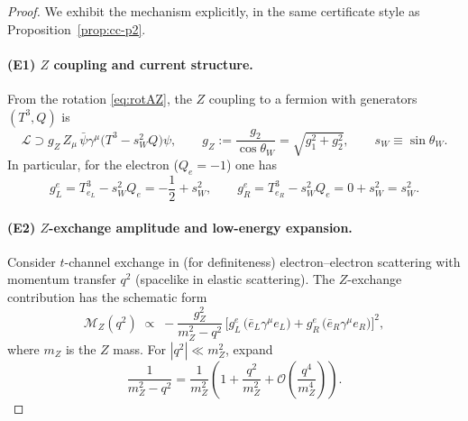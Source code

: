 \documentclass[11pt]{article}
\theoremstyle{remark}
\newcommand{\cO}{\mathcal{O}}
\begin{document}
\begin{proof}
We exhibit the mechanism explicitly, in the same certificate style as Proposition~\ref{prop:cc-p2}.

\paragraph{(E1) $Z$ coupling and current structure.}
From the rotation \eqref{eq:rotAZ}, the $Z$ coupling to a fermion with generators $(T^3,Q)$ is
\begin{equation}\label{eq:Z-coupling}
\mathcal{L}\supset g_Z\,Z_\mu\,\bar\psi\gamma^\mu\big(T^3-s_W^2 Q\big)\psi,
\qquad g_Z:=\frac{g_2}{\cos\theta_W}=\sqrt{g_1^2+g_2^2},\qquad s_W\equiv\sin\theta_W.
\end{equation}
In particular, for the electron ($Q_e=-1$) one has
\begin{equation}\label{eq:e-chiral-Z}
g_L^e = T^3_{e_L}-s_W^2 Q_e=-\frac12+s_W^2,\qquad
g_R^e = T^3_{e_R}-s_W^2 Q_e=0+s_W^2=s_W^2.
\end{equation}

\paragraph{(E2) $Z$-exchange amplitude and low-energy expansion.}
Consider $t$-channel exchange in (for definiteness) electron--electron scattering with momentum transfer
$q^2$ (spacelike in elastic scattering). The $Z$-exchange contribution has the schematic form
\begin{equation}\label{eq:MZschem}
\mathcal{M}_Z(q^2)\;\propto\;-
\frac{g_Z^2}{m_Z^2-q^2}\,
\big[g_L^e\,\big(\bar e_L\gamma^\mu e_L\big)+g_R^e\,\big(\bar e_R\gamma^\mu e_R\big)\big]^2,
\end{equation}
where $m_Z$ is the $Z$ mass. For $|q^2|\ll m_Z^2$, expand
\begin{equation}\label{eq:Zprop-expand}
\frac{1}{m_Z^2-q^2}=\frac{1}{m_Z^2}\left(1+\frac{q^2}{m_Z^2}+\cO\!\left(\frac{q^4}{m_Z^4}\right)\right).
\end{equation}


\end{proof}
\end{document}
